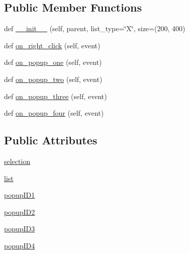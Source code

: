 \subsection*{Public Member Functions}
\begin{DoxyCompactItemize}
\item 
def \hyperlink{class_uni_dec_1_1datacollector_1_1_list_ctrl_panel_ae63cab4754ee7ccacae4e81e7fc310b9}{\+\_\+\+\_\+init\+\_\+\+\_\+} (self, parent, list\+\_\+type=\char`\"{}X\char`\"{}, size=(200, 400)
\item 
def \hyperlink{class_uni_dec_1_1datacollector_1_1_list_ctrl_panel_ade3e4883b7abd91c35df21edae271bf9}{on\+\_\+right\+\_\+click} (self, event)
\item 
def \hyperlink{class_uni_dec_1_1datacollector_1_1_list_ctrl_panel_a3068ae6b23d15422ffbc6357f23a4b5b}{on\+\_\+popup\+\_\+one} (self, event)
\item 
def \hyperlink{class_uni_dec_1_1datacollector_1_1_list_ctrl_panel_ac03d5bf15950a34f67d9051d870e1964}{on\+\_\+popup\+\_\+two} (self, event)
\item 
def \hyperlink{class_uni_dec_1_1datacollector_1_1_list_ctrl_panel_a81b653f3c32663af2fa54a2aa3943da6}{on\+\_\+popup\+\_\+three} (self, event)
\item 
def \hyperlink{class_uni_dec_1_1datacollector_1_1_list_ctrl_panel_ae6846be4bce46edef21446cb045d25d8}{on\+\_\+popup\+\_\+four} (self, event)
\end{DoxyCompactItemize}
\subsection*{Public Attributes}
\begin{DoxyCompactItemize}
\item 
\hyperlink{class_uni_dec_1_1datacollector_1_1_list_ctrl_panel_acb97652b5e31ccee5a89c5f12120585c}{selection}
\item 
\hyperlink{class_uni_dec_1_1datacollector_1_1_list_ctrl_panel_a4edc446130b78132d51247bbe0e0e490}{list}
\item 
\hyperlink{class_uni_dec_1_1datacollector_1_1_list_ctrl_panel_acea626c02f1ce689b95d832d479de8f8}{popup\+I\+D1}
\item 
\hyperlink{class_uni_dec_1_1datacollector_1_1_list_ctrl_panel_aa2dedfbd88cbeee6d3e7673577206fa8}{popup\+I\+D2}
\item 
\hyperlink{class_uni_dec_1_1datacollector_1_1_list_ctrl_panel_a63bc2ef6bbf43ea119154b66ad0b2bbc}{popup\+I\+D3}
\item 
\hyperlink{class_uni_dec_1_1datacollector_1_1_list_ctrl_panel_af2aa14072bdabe4c2dd1456ef179f1da}{popup\+I\+D4}
\end{DoxyCompactItemize}


